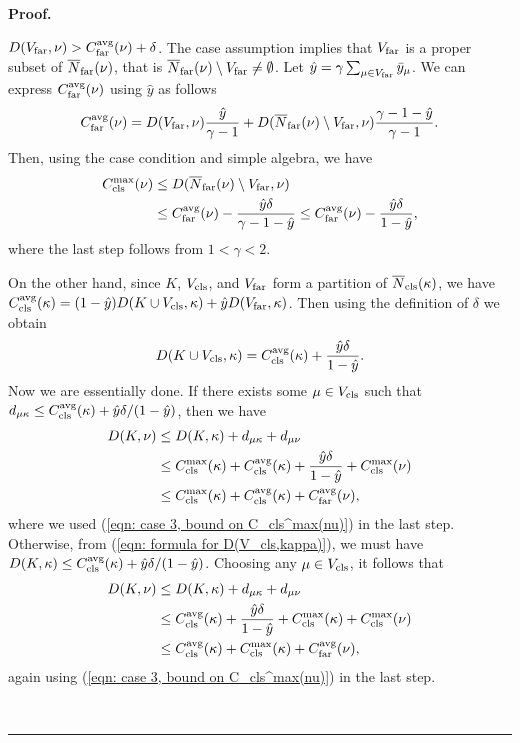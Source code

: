 \documentclass[oneside,final]{ucr}
\newenvironment{proof}[1][Proof]{\textbf{#1.} }{\ \rule{0.5em}{0.5em}}
\begin{document}
\begin{proof}
\begin{description}
\item{} {$D(V_{{\mbox{\scriptsize\rm far}}}, \nu) > C_{{\mbox{\scriptsize\rm far}}}^{{\mbox{\scriptsize\rm avg}}}(\nu) + \delta$}.
  The case assumption implies that $V_{{\mbox{\scriptsize\rm far}}}$ is a proper subset of
  ${\overline{N}}_{{\mbox{\scriptsize\rm far}}}(\nu)$, that is ${\overline{N}}_{{\mbox{\scriptsize\rm far}}}(\nu) \setminus V_{{\mbox{\scriptsize\rm far}}}
  \neq\emptyset$.  Let $\hat{y} = \gamma \sum_{\mu\in V_{{\mbox{\tiny\rm far}}}}
  {\bar y}_{\mu}$.  We can express $C_{{\mbox{\scriptsize\rm far}}}^{{\mbox{\scriptsize\rm avg}}}(\nu)$ using $\hat{y}$ as
  follows
%
\begin{equation*}
C_{{\mbox{\scriptsize\rm far}}}^{{\mbox{\scriptsize\rm avg}}}(\nu) = D(V_{{\mbox{\scriptsize\rm far}}},\nu) \frac{\hat{y}}{\gamma-1} +
    D({\overline{N}}_{{\mbox{\scriptsize\rm far}}}(\nu)\setminus V_{{\mbox{\scriptsize\rm far}}}, \nu) \frac{\gamma-1-\hat{y}}{\gamma-1}.
\end{equation*}
%
Then, using the case condition and simple algebra, we have
%
  \begin{align}
    \clsmax(\nu) &\leq D(\wbarfarnb(\nu) \setminus V_{\far}, \nu) 
			\notag
		\\
		&\leq \fardist(\nu) - \frac{\hat{y}\delta}{\gamma-1-\hat{y}} 
		\leq \fardist(\nu) - \frac{\hat{y}\delta}{1-\hat{y}},
			\label{eqn: case 3, bound on C_cls^max(nu)}
  \end{align}
%
where the last step follows from $1 < \gamma < 2$. 

On the other hand, since $K$, $V_{{\mbox{\scriptsize\rm cls}}}$, and $V_{{\mbox{\scriptsize\rm far}}}$ form a partition of ${\overline{N}}_{{\mbox{\scriptsize\rm cls}}}(\kappa)$,
we have
$C_{{\mbox{\scriptsize\rm cls}}}^{{\mbox{\scriptsize\rm avg}}}(\kappa) = (1-\hat{y}) D(K\cup V_{{\mbox{\scriptsize\rm cls}}}, \kappa) + \hat{y} D(V_{{\mbox{\scriptsize\rm far}}}, \kappa)$.
Then using the definition of $\delta$ we obtain
%
\begin{equation}
    D(K \cup V_{\cls}, \kappa) = \clsdist(\kappa) + \frac{\hat{y}\delta}{1-\hat{y}}.
				\label{eqn: formula for D(V_cls,kappa)}
\end{equation}
%
  Now we are essentially done. If there exists some $\mu \in V_{{\mbox{\scriptsize\rm cls}}}$ such
  that $d_{\mu\kappa} \leq C_{{\mbox{\scriptsize\rm cls}}}^{{\mbox{\scriptsize\rm avg}}}(\kappa) +
  \hat{y}\delta/(1-\hat{y})$, then	we have
%
  \begin{align*}
    D(K, \nu) &\leq D(K, \kappa) + d_{\mu\kappa} + d_{\mu\nu} \\
    &\leq C_{{\mbox{\scriptsize\rm cls}}}^{\max}(\kappa) + C_{{\mbox{\scriptsize\rm cls}}}^{{\mbox{\scriptsize\rm avg}}}(\kappa) +
    			\frac{\hat{y}\delta}{1-\hat{y}}
    + C_{{\mbox{\scriptsize\rm cls}}}^{\max}(\nu)\\
    &\leq C_{{\mbox{\scriptsize\rm cls}}}^{\max}(\kappa) + C_{{\mbox{\scriptsize\rm cls}}}^{{\mbox{\scriptsize\rm avg}}}(\kappa) + C_{{\mbox{\scriptsize\rm far}}}^{{\mbox{\scriptsize\rm avg}}}(\nu),
  \end{align*}
%
where we used (\ref{eqn: case 3, bound on C_cls^max(nu)}) in the last step.
  Otherwise, from (\ref{eqn: formula for D(V_cls,kappa)}),
we must have $D(K, \kappa) \leq C_{{\mbox{\scriptsize\rm cls}}}^{{\mbox{\scriptsize\rm avg}}}(\kappa) +
  \hat{y}\delta/(1-\hat{y})$. Choosing any $\mu \in V_{{\mbox{\scriptsize\rm cls}}}$, it follows that
%
  \begin{align*}
    D(K, \nu) &\leq D(K, \kappa) + d_{\mu\kappa} + d_{\mu\nu} \\
    &\leq C_{{\mbox{\scriptsize\rm cls}}}^{{\mbox{\scriptsize\rm avg}}}(\kappa) + \frac{\hat{y}\delta}{1-\hat{y}} +
    		C_{{\mbox{\scriptsize\rm cls}}}^{\max}(\kappa)  + C_{{\mbox{\scriptsize\rm cls}}}^{\max}(\nu)\\
    &\leq C_{{\mbox{\scriptsize\rm cls}}}^{{\mbox{\scriptsize\rm avg}}}(\kappa) + C_{{\mbox{\scriptsize\rm cls}}}^{\max}(\kappa) + C_{{\mbox{\scriptsize\rm far}}}^{{\mbox{\scriptsize\rm avg}}}(\nu),
  \end{align*}
%
again using (\ref{eqn: case 3, bound on C_cls^max(nu)}) in the last step.


\end{description}
\end{proof}
\end{document}
